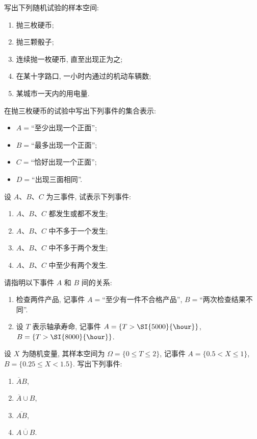\begin{xiti}
  \item 写出下列随机试验的样本空间:
  \begin{enumerate}
    \item 抛三枚硬币;
    \item 抛三颗骰子;
    \item 连续抛一枚硬币, 直至出现正为之;
    \item 在某十字路口, 一小时内通过的机动车辆数;
    \item 某城市一天内的用电量.
  \end{enumerate}

  \item 在抛三枚硬币的试验中写出下列事件的集合表示:
  \begin{itemize}
    \item $A =$“至少出现一个正面”;
    \item $B =$“最多出现一个正面”;
    \item $C =$“恰好出现一个正面”;
    \item $D =$“出现三面相同”.
  \end{itemize}

  \item 设 $A$、$B$、$C$ 为三事件, 试表示下列事件:
  \begin{enumerate}
    \item $A$、$B$、$C$ 都发生或都不发生;
    \item $A$、$B$、$C$ 中不多于一个发生;
    \item $A$、$B$、$C$ 中不多于两个发生;
    \item $A$、$B$、$C$ 中至少有两个发生.
  \end{enumerate}

  \item 请指明以下事件 $A$ 和 $B$ 间的关系:
  \begin{enumerate}
    \item 检查两件产品, 记事件 $A =$“至少有一件不合格产品”, $B =$“两次检查结果不同”.
    \item 设 $T$ 表示轴承寿命, 记事件 $A = \{T > \text{\SI{5000}{\hour}}\}$, $B = \{T > \text{\SI{8000}{\hour}}\}$.
  \end{enumerate}

  \item 设 $X$ 为随机变量, 其样本空间为 $\Omega = \{0 \le T \le 2\}$, 记事件 $A =\{0.5 < X \le 1\}$, $B = \{0.25 \le X < 1.5\}$. 写出下列事件:
  \begin{enumerate}
    \item $\overline{A}B$,
    \item $\overline{A} \cup B$,
    \item $\overline{AB}$,
    \item $\overline{A \cup B}$.
  \end{enumerate}


\end{xiti}
